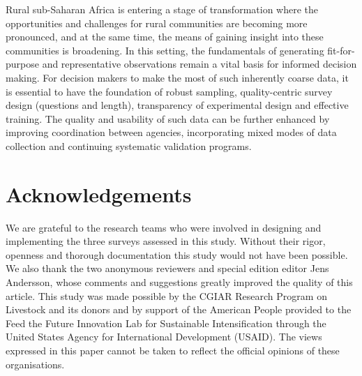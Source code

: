 Rural sub-Saharan Africa is entering a stage of transformation where the opportunities and challenges for rural communities are becoming more pronounced, and at the same time, the means of gaining insight into these communities is broadening. In this setting, the fundamentals of generating fit-for-purpose and representative observations remain a vital basis for informed decision making. For decision makers to make the most of such inherently coarse data, it is essential to have the foundation of robust sampling, quality-centric survey design (questions and length), transparency of experimental design and effective training. The quality and usability of such data can be further enhanced by improving coordination between agencies, incorporating mixed modes of data collection and continuing systematic validation programs.

\section{Acknowledgements}

We are grateful to the research teams who were involved in designing and implementing the three surveys assessed in this study. Without their rigor, openness and thorough documentation this study would not have been possible. We also thank the two anonymous reviewers and special edition editor Jens Andersson, whose comments and suggestions greatly improved the quality of this article. This study was made possible by the CGIAR Research Program on Livestock and its donors and by support of the American People provided to the Feed the Future Innovation Lab for Sustainable Intensification through the United States Agency for International Development (USAID). The views expressed in this paper cannot be taken to reflect the official opinions of these organisations.
